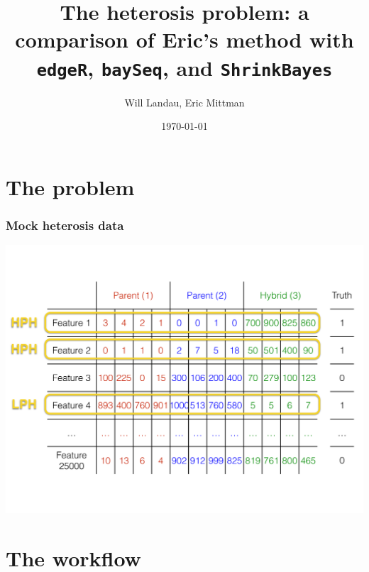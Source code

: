 \documentclass{beamer}
\title{The heterosis problem: a comparison of Eric's method with {\tt edgeR}, {\tt baySeq}, and {\tt ShrinkBayes}}
\author{Will Landau, Eric Mittman}
\date{\today}
\institute{Iowa State University}
\numberwithin{equation}{section}
\begin{document}
\begin{frame}
\titlepage
\end{frame}


\section{The problem}

\begin{frame}
\frametitle{Mock heterosis data}
\begin{center}
\includegraphics[scale=.28]{data}
\end{center}
\end{frame}

\section{The workflow}
\end{document}
